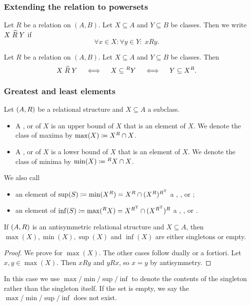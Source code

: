 \subsubsection{Extending the relation to powersets}
\begin{definition}
Let $R$ be a relation on $(A,B)$. Let $X\subseteq A$ and $Y\subseteq B$ be classes. Then we write $X\mathrel{\widehat{R}}Y$ if
\[ \forall x\in X: \forall y\in Y: \; xRy. \]
\end{definition}

\begin{lemma} \label{polarsSetRelation}
Let $R$ be a relation on $(A,B)$. Let $X\subseteq A$ and $Y\subseteq B$ be classes. Then
\[ X \mathrel{\widehat{R}} Y \quad\iff\quad X \subseteq {^RY} \quad\iff\quad Y \subseteq X^R. \]
\end{lemma}

\subsubsection{Greatest and least elements}
\begin{definition}
Let $\left( A, R \right)$ be a relational structure and $X\subseteq A$ a subclass.
\begin{itemize}
\item A ,  or  of $X$ is an upper bound of $X$ that is an element of $X$. We denote the class of maxima by $\max(X) \coloneqq X^R\cap X$.
\item A ,  or  of $X$ is a lower bound of $X$ that is an element of $X$. We denote the class of minima by $\min(X) \coloneqq {^RX}\cap X$.
\end{itemize}
We also call
\begin{itemize}
\item an element of $\sup(S) \coloneqq \min(X^R) = X^R \cap (X^R)^{R^{\mathrm{T}}}$ a , , or ;
\item an element of $\inf(S) \coloneqq \max({^RX}) = X^{R^{\mathrm{T}}} \cap (X^{R^{\mathrm{T}}})^R$ a , , or .
\end{itemize}
\end{definition}

\begin{lemma} \label{minMaxSingletons}
If $\left( A, R \right)$ is an antisymmetric relational structure and $X\subseteq A$, then $\max(X), \min(X), \sup(X)$ and $\inf(X)$ are either singletons or empty.
\end{lemma}
\begin{proof}
We prove for $\max(X)$. The other cases follow dually or a fortiori. Let $x,y\in \max(X)$. Then $xRy$ and $yRx$, so $x=y$ by antisymmetry.
\end{proof}
In this case we use $\max/\min/\sup/\inf$ to denote the contents of the singleton rather than the singleton itself. If the set is empty, we say the $\max/\min/\sup/\inf$ does not exist.

